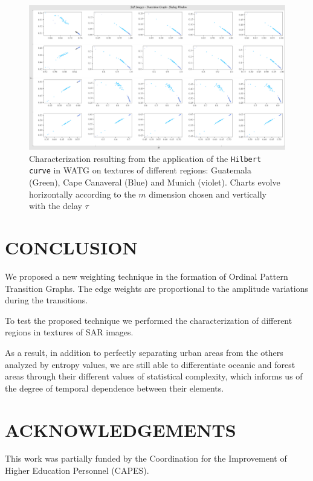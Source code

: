 \documentclass{isprs}
\begin{document}
\begin{figure}
	\centering
	\includegraphics[width=1.05\textwidth]{Figures/transitionGraphHilbert.pdf}
	\caption{Characterization resulting from the application of the \texttt{Hilbert curve} in WATG on textures of different regions: Guatemala (Green), Cape Canaveral (Blue) and Munich (violet). Charts evolve horizontally according to the $m$ dimension chosen and vertically with the delay $\tau$}
	\label{fig:Regions}
\end{figure}



\section{CONCLUSION}\label{Conclusion}

We proposed a new weighting technique in the formation of Ordinal Pattern Transition Graphs.
The edge weights are proportional to the amplitude variations during the transitions.

To test the proposed technique we performed the characterization of different regions in textures of SAR images.

As a result, in addition to perfectly separating urban areas from the others analyzed by entropy values, we are still able to differentiate oceanic and forest areas through their different values of statistical complexity, which informs us of the degree of temporal dependence between their elements.




\section*{ACKNOWLEDGEMENTS}\label{ACKNOWLEDGEMENTS}

This work was partially funded by the Coordination for the Improvement of Higher Education Personnel (CAPES).
\end{document}
